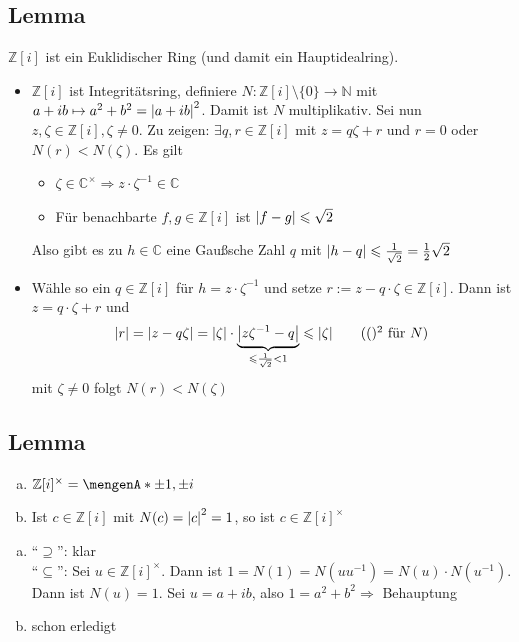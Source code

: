 \subsection[Lemma: Der Ring der Gaußschen Zahlen ist ein Hauptidealring]{Lemma} %
\label{sub:919}
$\mathds{Z}[i]$ ist ein Euklidischer Ring (und damit ein Hauptidealring).
\begin{itemize}
	\item $\mathds{Z}[i]$ ist Integritätsring, definiere $N : \mathds{Z}[i] \setminus \{0\} \to \mathds{N}$ mit $a+ ib \mapsto a^2 + b^2 = \abs*{a+ ib}^2 $. Damit ist $N$
	multiplikativ. Sei nun $z, \zeta \in \mathds{Z}[i], \zeta \not= 0$. Zu zeigen: $\exists q,r \in \mathds{Z}[i]$ mit $z= q \zeta +r$ und $r=0$ oder 
	$N(r) < N(\zeta)$. Es gilt \begin{itemize}
		\item $\zeta \in \mathds{C}^\times \Rightarrow z \cdot \zeta ^{-1} \in \mathds{C}$
		\item Für benachbarte $f,g \in \mathds{Z}[i]$ ist $\abs*{f-g} \le \sqrt{2}$
	\end{itemize}
	Also gibt es zu $h \in \mathds{C}$ eine Gaußsche Zahl $q$ mit $\abs*{h-q} \le \frac{1}{\sqrt{2}} = \frac{1}{2} \sqrt{2}     $
	\item Wähle so ein $q \in \mathds{Z}[i]$ für $h = z \cdot \zeta ^{-1}$ und setze $r := z - q \cdot \zeta \in \mathds{Z}[i]$. Dann ist $z= q \cdot \zeta +r$ und 
	\[
		\abs*{r} = \abs*{z- q \zeta} = \abs*{\zeta} \cdot \underbrace{\abs*{z \zeta ^{-1} - q}}_{\le \frac{1}{\sqrt{2}} < 1} \le \abs*{\zeta} \tag{$()^2$ für $N$}
	\]
	mit $\zeta \not= 0 $ folgt $ N(r) < N(\zeta)$ \bewende
\end{itemize}

\subsection[Lemma: Einheiten in den Gaußschen Zahlen]{Lemma} %
\label{sub:920}
\begin{enumerate}[a)]
	\item $\mathds{Z}[i]^\times = \set{\pm 1, \pm i} $
	\item Ist $c \in \mathds{Z}[i]$ mit $N(c)= \abs*{c}^2 = 1 $, so ist $c \in \mathds{Z}[i]^\times$
\end{enumerate}
\begin{enumerate}[a)]
	\item \enquote{$\supseteq$}: klar \\
	\enquote{$\subseteq$}: Sei $u \in \mathds{Z}[i]^\times$. Dann ist $1=N(1)= N(u u ^{-1}) = N(u) \cdot N(u ^{-1})$. Dann ist $N(u) = 1$. Sei $u= a+ ib$, also 
	$1= a^2 + b^2 \Rightarrow $ Behauptung
	\item schon erledigt \bewende
\end{enumerate}


